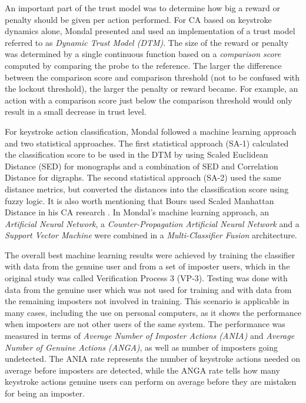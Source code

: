 An important part of the trust model was to determine how big a reward or penalty should be given per action performed.
For CA based on keystroke dynamics alone, Mondal \cite{mondal} presented and used an implementation of a trust model referred to as \textit{Dynamic Trust Model (DTM)}.
The size of the reward or penalty was determined by a single continuous function based on a \textit{comparison score} computed by comparing the probe to the reference.
The larger the difference between the comparison score and comparison threshold (not to be confused with the lockout threshold), the larger the penalty or reward became.
For example, an action with a comparison score just below the comparison threshold would only result in a small decrease in trust level.

For keystroke action classification, Mondal followed a machine learning approach and two statistical approaches.
The first statistical approach (SA-1) calculated the classification score to be used in the DTM by using Scaled Euclidean Distance (SED) for monographs and a combination of SED and Correlation Distance for digraphs. 
The second statistical approach (SA-2) used the same distance metrics, but converted the distances into the classification score using fuzzy logic.
It is also worth mentioning that Bours used Scaled Manhattan Distance in his CA research \cite{BOURS201236}.
In Mondal's \cite{mondal} machine learning approach, an \textit{Artificial Neural Network}, a \textit{Counter-Propagation Artificial Neural Network} and a \textit{Support Vector Machine} were combined in a \textit{Multi-Classifier Fusion} architecture. 

The overall best machine learning results were achieved by training the classifier with data from the genuine user and from a set of imposter users, which in the original study \cite{mondal} was called Verification Process 3 (VP-3).
Testing was done with data from the genuine user which was not used for training and with data from the remaining imposters not involved in training.
This scenario is applicable in many cases, including the use on personal computers, as it shows the performance when imposters are not other users of the same system.
The performance was measured in terms of \textit{Average Number of Imposter Actions (ANIA)} and \textit{Average Number of Genuine Actions (ANGA)}, as well as number of imposters going undetected.
The ANIA rate represents the number of keystroke actions needed on average before imposters are detected, while the ANGA rate tells how many keystroke actions genuine users can perform on average before they are mistaken for being an imposter.

